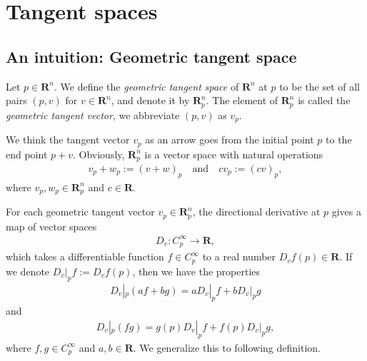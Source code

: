 
\chapter{Tangent spaces}

\begin{comment}
    \begin{definition}[Germ]
        Let $C^\infty_p$ be the set of all smooth function defined on some neighborhood of $p$. Let $f, g \in C^\infty_p$ with domains $U$ and $V$, respectively. We define the equivalence relation $f \sim g$ if there exists an open set $W \subset V \cap U$ such that $f = g$ on $W$. We denote the equivalence class of $f$ by $[f]$, which is called a \emph{$C^\infty$-germ} of $f$ at $p$.
    \end{definition}
    \end{comment}

\section{An intuition: Geometric tangent space}

\begin{definition}
    Let $p \in \mathbf{R}^n$. We define the \emph{geometric tangent space} of $\mathbf{R}^n$ at $p$ to be the set of all pairs $(p, v)$ for $v \in \mathbf{R}^n$, and denote it by $\mathbf{R}^n_p$. The element of $\mathbf{R}^n_p$ is called the \emph{geometric tangent vector}, we abbreviate $(p, v)$ as $v_p$.
\end{definition}

We think the tangent vector $v_p$ as an arrow goes from the initial point $p$ to the end point $p + v$. Obviously, $\mathbf{R}^n_p$ is a vector space with natural operations
    \begin{align*}
        v_p + w_p := (v + w)_p
        \quad\text{and}\quad
        cv_p := (cv)_p,
    \end{align*}
where $v_p, w_p \in \mathbf{R}^n_p$ and $c \in \mathbf{R}$.

For each geometric tangent vector $v_p \in \mathbf{R}^n_p$, the directional derivative at $p$ gives a map of vector spaces
    \begin{align*}
        D_v : C^\infty_p \to \mathbf{R},
    \end{align*}
which takes a differentiable function $f \in C^\infty_p$ to a real number $D_vf(p) \in \mathbf{R}$. If we denote $D_v|_p f := D_vf(p)$, then we have the properties
    \begin{align*}
        D_v|_p(a f + bg) = aD_v|_pf + bD_v|_pg
    \end{align*}
and
    \begin{align*}
        D_v|_p(fg) = g(p)D_v|_pf + f(p)D_v|_pg,
    \end{align*}
where $f, g \in C^\infty_p$ and $a, b \in \mathbf{R}$. We generalize this to following definition.


